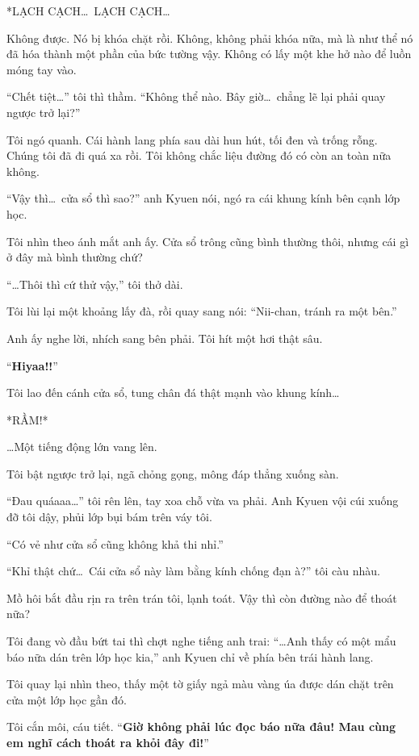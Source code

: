 \documentclass[../main.tex]{subfiles}
\begin{document}
*LẠCH CẠCH\dots\ LẠCH CẠCH\dots*

Không được. Nó bị khóa chặt rồi. Không, không phải khóa nữa, mà là như thể nó đã hóa thành một phần của bức tường vậy. Không có lấy một khe hở nào để luồn móng tay vào.

``Chết tiệt\dots'' tôi thì thầm. ``Không thể nào. Bây giờ\dots\ chẳng lẽ lại phải quay ngược trở lại?''

Tôi ngó quanh. Cái hành lang phía sau dài hun hút, tối đen và trống rỗng. Chúng tôi đã đi quá xa rồi. Tôi không chắc liệu đường đó có còn an toàn nữa không.

``Vậy thì\dots\ cửa sổ thì sao?'' anh Kyuen nói, ngó ra cái khung kính bên cạnh lớp học.

Tôi nhìn theo ánh mắt anh ấy. Cửa sổ trông cũng bình thường thôi, nhưng cái gì ở đây mà bình thường chứ?

``\dots Thôi thì cứ thử vậy,'' tôi thở dài.

Tôi lùi lại một khoảng lấy đà, rồi quay sang nói: ``Nii-chan, tránh ra một bên.''

Anh ấy nghe lời, nhích sang bên phải. Tôi hít một hơi thật sâu.

``\textbf{Hiyaa!!}''

Tôi lao đến cánh cửa sổ, tung chân đá thật mạnh vào khung kính\dots

*RẦM!*

\dots Một tiếng động lớn vang lên.

Tôi bật ngược trở lại, ngã chỏng gọng, mông đáp thẳng xuống sàn.

``Đau quáaaa\dots'' tôi rên lên, tay xoa chỗ vừa va phải. Anh Kyuen vội cúi xuống đỡ tôi dậy, phủi lớp bụi bám trên váy tôi.

``Có vẻ như cửa sổ cũng không khả thi nhỉ.''

``Khỉ thật chứ\dots\ Cái cửa sổ này làm bằng kính chống đạn à?'' tôi càu nhàu.

Mồ hôi bắt đầu rịn ra trên trán tôi, lạnh toát. Vậy thì còn đường nào để thoát nữa?

Tôi đang vò đầu bứt tai thì chợt nghe tiếng anh trai: ``\dots Anh thấy có một mẩu báo nữa dán trên lớp học kia,'' anh Kyuen chỉ về phía bên trái hành lang.

Tôi quay lại nhìn theo, thấy một tờ giấy ngả màu vàng úa được dán chặt trên cửa một lớp học gần đó.

Tôi cắn môi, cáu tiết. ``\textbf{Giờ không phải lúc đọc báo nữa đâu! Mau cùng em nghĩ cách thoát ra khỏi đây đi!}''
\end{document}
